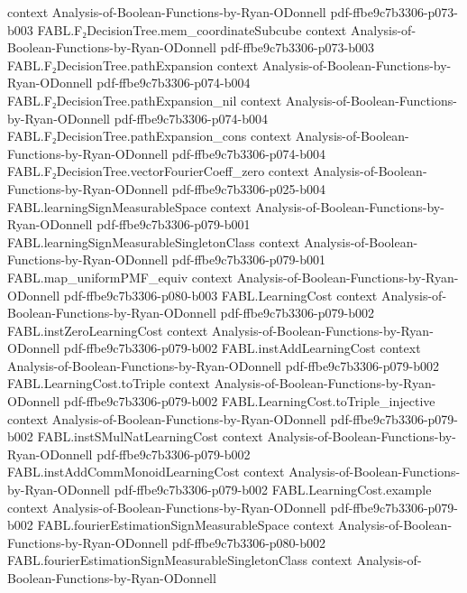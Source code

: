 \begin{theorem}
  {context}
  {Analysis-of-Boolean-Functions-by-Ryan-ODonnell}
  {pdf-ffbe9c7b3306-p073-b003}
\proofstep
  {FABL.F₂DecisionTree.mem_coordinateSubcube}
  {context}
  {Analysis-of-Boolean-Functions-by-Ryan-ODonnell}
  {pdf-ffbe9c7b3306-p073-b003}
\proofstep
  {FABL.F₂DecisionTree.pathExpansion}
  {context}
  {Analysis-of-Boolean-Functions-by-Ryan-ODonnell}
  {pdf-ffbe9c7b3306-p074-b004}
\proofstep
  {FABL.F₂DecisionTree.pathExpansion_nil}
  {context}
  {Analysis-of-Boolean-Functions-by-Ryan-ODonnell}
  {pdf-ffbe9c7b3306-p074-b004}
\proofstep
  {FABL.F₂DecisionTree.pathExpansion_cons}
  {context}
  {Analysis-of-Boolean-Functions-by-Ryan-ODonnell}
  {pdf-ffbe9c7b3306-p074-b004}
\proofstep
  {FABL.F₂DecisionTree.vectorFourierCoeff_zero}
  {context}
  {Analysis-of-Boolean-Functions-by-Ryan-ODonnell}
  {pdf-ffbe9c7b3306-p025-b004}
\proofstep
  {FABL.learningSignMeasurableSpace}
  {context}
  {Analysis-of-Boolean-Functions-by-Ryan-ODonnell}
  {pdf-ffbe9c7b3306-p079-b001}
\proofstep
  {FABL.learningSignMeasurableSingletonClass}
  {context}
  {Analysis-of-Boolean-Functions-by-Ryan-ODonnell}
  {pdf-ffbe9c7b3306-p079-b001}
\proofstep
  {FABL.map_uniformPMF_equiv}
  {context}
  {Analysis-of-Boolean-Functions-by-Ryan-ODonnell}
  {pdf-ffbe9c7b3306-p080-b003}
\proofstep
  {FABL.LearningCost}
  {context}
  {Analysis-of-Boolean-Functions-by-Ryan-ODonnell}
  {pdf-ffbe9c7b3306-p079-b002}
\proofstep
  {FABL.instZeroLearningCost}
  {context}
  {Analysis-of-Boolean-Functions-by-Ryan-ODonnell}
  {pdf-ffbe9c7b3306-p079-b002}
\proofstep
  {FABL.instAddLearningCost}
  {context}
  {Analysis-of-Boolean-Functions-by-Ryan-ODonnell}
  {pdf-ffbe9c7b3306-p079-b002}
\proofstep
  {FABL.LearningCost.toTriple}
  {context}
  {Analysis-of-Boolean-Functions-by-Ryan-ODonnell}
  {pdf-ffbe9c7b3306-p079-b002}
\proofstep
  {FABL.LearningCost.toTriple_injective}
  {context}
  {Analysis-of-Boolean-Functions-by-Ryan-ODonnell}
  {pdf-ffbe9c7b3306-p079-b002}
\proofstep
  {FABL.instSMulNatLearningCost}
  {context}
  {Analysis-of-Boolean-Functions-by-Ryan-ODonnell}
  {pdf-ffbe9c7b3306-p079-b002}
\proofstep
  {FABL.instAddCommMonoidLearningCost}
  {context}
  {Analysis-of-Boolean-Functions-by-Ryan-ODonnell}
  {pdf-ffbe9c7b3306-p079-b002}
\proofstep
  {FABL.LearningCost.example}
  {context}
  {Analysis-of-Boolean-Functions-by-Ryan-ODonnell}
  {pdf-ffbe9c7b3306-p079-b002}
\proofstep
  {FABL.fourierEstimationSignMeasurableSpace}
  {context}
  {Analysis-of-Boolean-Functions-by-Ryan-ODonnell}
  {pdf-ffbe9c7b3306-p080-b002}
\proofstep
  {FABL.fourierEstimationSignMeasurableSingletonClass}
  {context}
  {Analysis-of-Boolean-Functions-by-Ryan-ODonnell}

\end{theorem}
